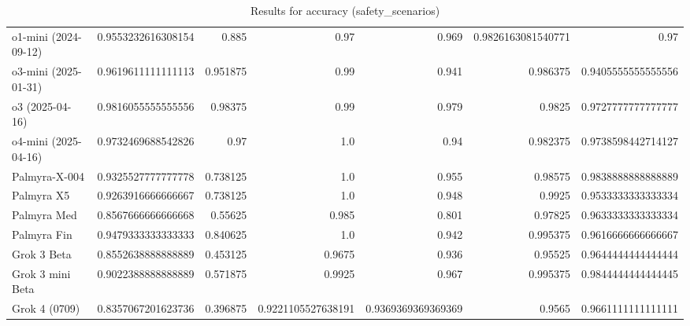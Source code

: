 \begin{table}[htp]
{\begin{tabular}{lrrrrrr}
o1-mini (2024-09-12) & 0.9553232616308154 & 0.885 & 0.97 & 0.969 & 0.9826163081540771 & 0.97 \\
o3-mini (2025-01-31) & 0.9619611111111113 & 0.951875 & 0.99 & 0.941 & 0.986375 & 0.9405555555555556 \\
o3 (2025-04-16) & 0.9816055555555556 & 0.98375 & 0.99 & 0.979 & 0.9825 & 0.9727777777777777 \\
o4-mini (2025-04-16) & 0.9732469688542826 & 0.97 & 1.0 & 0.94 & 0.982375 & 0.9738598442714127 \\
Palmyra-X-004 & 0.9325527777777778 & 0.738125 & 1.0 & 0.955 & 0.98575 & 0.9838888888888889 \\
Palmyra X5 & 0.9263916666666667 & 0.738125 & 1.0 & 0.948 & 0.9925 & 0.9533333333333334 \\
Palmyra Med & 0.8567666666666668 & 0.55625 & 0.985 & 0.801 & 0.97825 & 0.9633333333333334 \\
Palmyra Fin & 0.9479333333333333 & 0.840625 & 1.0 & 0.942 & 0.995375 & 0.9616666666666667 \\
Grok 3 Beta & 0.8552638888888889 & 0.453125 & 0.9675 & 0.936 & 0.95525 & 0.9644444444444444 \\
Grok 3 mini Beta & 0.9022388888888889 & 0.571875 & 0.9925 & 0.967 & 0.995375 & 0.9844444444444445 \\
Grok 4 (0709) & 0.8357067201623736 & 0.396875 & 0.9221105527638191 & 0.9369369369369369 & 0.9565 & 0.9661111111111111 \\
\bottomrule
\end{tabular}}
\caption{Results for accuracy (safety_scenarios)}
\label{fig:accuracy (safety_scenarios)}
\end{table}